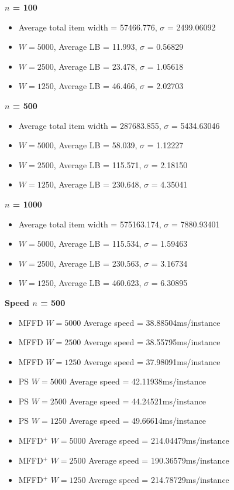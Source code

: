 \documentclass[oribibl]{llncs}
\begin{document}
\textbf{$n$ = 100}
\begin{itemize}
	\item Average total item width = 57466.776, $\sigma$ = 2499.06092
	\item $W = 5000$, Average LB = 11.993, $\sigma$ = 0.56829
	\item $W = 2500$, Average LB = 23.478, $\sigma$ = 1.05618
	\item $W = 1250$, Average LB = 46.466, $\sigma$ = 2.02703
\end{itemize}

\textbf{$n$ = 500}
\begin{itemize}
	\item Average total item width = 287683.855, $\sigma$ = 5434.63046
	\item $W = 5000$, Average LB = 58.039, $\sigma$ = 1.12227
	\item $W = 2500$, Average LB = 115.571, $\sigma$ = 2.18150
	\item $W = 1250$, Average LB = 230.648, $\sigma$ = 4.35041
\end{itemize}

\textbf{$n$ = 1000}
\begin{itemize}
	\item Average total item width = 575163.174, $\sigma$ = 7880.93401
	\item $W = 5000$, Average LB = 115.534, $\sigma$ = 1.59463
	\item $W = 2500$, Average LB = 230.563, $\sigma$ = 3.16734
	\item $W = 1250$, Average LB = 460.623, $\sigma$ = 6.30895
\end{itemize}

\textbf{Speed $n$ = 500}
\begin{itemize}
	\item MFFD $W = 5000$ Average speed = 38.88504ms/instance
	\item MFFD $W = 2500$ Average speed = 38.55795ms/instance
	\item MFFD $W = 1250$ Average speed = 37.98091ms/instance
	\item PS $W = 5000$ Average speed = 42.11938ms/instance
	\item PS $W = 2500$ Average speed = 44.24521ms/instance
	\item PS $W = 1250$ Average speed = 49.66614ms/instance
	\item MFFD$^+$ $W = 5000$ Average speed = 214.04479ms/instance
	\item MFFD$^+$ $W = 2500$ Average speed = 190.36579ms/instance
	\item MFFD$^+$ $W = 1250$ Average speed = 214.78729ms/instance
\end{itemize}
\end{document}
